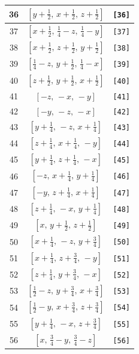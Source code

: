 \documentclass[fleqn,8pt]{jsarticle}
\begin{document}
\begin{longtable}{ccc}
36 & $\left[ y + \frac{1}{2},\, x + \frac{1}{2},\, z + \frac{1}{2} \right]$ & {\tt [36]} \\ \hline
37 & $\left[ x + \frac{1}{2},\, \frac{1}{4} - z,\, \frac{1}{4} - y \right]$ & {\tt [37]} \\ \hline
38 & $\left[ x + \frac{1}{2},\, z + \frac{1}{2},\, y + \frac{1}{2} \right]$ & {\tt [38]} \\ \hline
39 & $\left[ \frac{1}{4} - z,\, y + \frac{1}{2},\, \frac{1}{4} - x \right]$ & {\tt [39]} \\ \hline
40 & $\left[ z + \frac{1}{2},\, y + \frac{1}{2},\, x + \frac{1}{2} \right]$ & {\tt [40]} \\ \hline
41 & $\left[ - z,\, - x,\, - y \right]$ & {\tt [41]} \\ \hline
42 & $\left[ - y,\, - z,\, - x \right]$ & {\tt [42]} \\ \hline
43 & $\left[ y + \frac{1}{4},\, - z,\, x + \frac{1}{4} \right]$ & {\tt [43]} \\ \hline
44 & $\left[ z + \frac{1}{4},\, x + \frac{1}{4},\, - y \right]$ & {\tt [44]} \\ \hline
45 & $\left[ y + \frac{1}{4},\, z + \frac{1}{4},\, - x \right]$ & {\tt [45]} \\ \hline
46 & $\left[ - z,\, x + \frac{1}{4},\, y + \frac{1}{4} \right]$ & {\tt [46]} \\ \hline
47 & $\left[ - y,\, z + \frac{1}{4},\, x + \frac{1}{4} \right]$ & {\tt [47]} \\ \hline
48 & $\left[ z + \frac{1}{4},\, - x,\, y + \frac{1}{4} \right]$ & {\tt [48]} \\ \hline
49 & $\left[ x,\, y + \frac{1}{2},\, z + \frac{1}{2} \right]$ & {\tt [49]} \\ \hline
50 & $\left[ x + \frac{1}{4},\, - z,\, y + \frac{3}{4} \right]$ & {\tt [50]} \\ \hline
51 & $\left[ x + \frac{1}{4},\, z + \frac{3}{4},\, - y \right]$ & {\tt [51]} \\ \hline
52 & $\left[ z + \frac{1}{4},\, y + \frac{3}{4},\, - x \right]$ & {\tt [52]} \\ \hline
53 & $\left[ \frac{1}{2} - z,\, y + \frac{3}{4},\, x + \frac{3}{4} \right]$ & {\tt [53]} \\ \hline
54 & $\left[ \frac{1}{2} - y,\, x + \frac{3}{4},\, z + \frac{3}{4} \right]$ & {\tt [54]} \\ \hline
55 & $\left[ y + \frac{1}{4},\, - x,\, z + \frac{3}{4} \right]$ & {\tt [55]} \\ \hline
56 & $\left[ x,\, \frac{3}{4} - y,\, \frac{3}{4} - z \right]$ & {\tt [56]} \\ \hline

\end{longtable}
\end{document}
